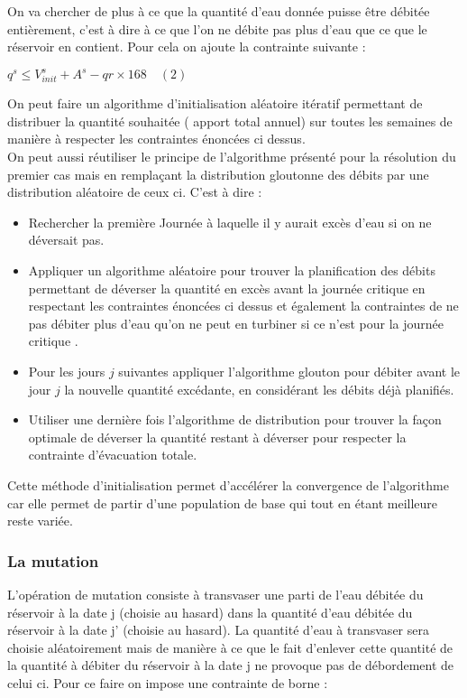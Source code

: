 \documentclass[a4paper]{report}
\begin{document}
On va chercher de plus à ce que la quantité d'eau donnée puisse être débitée entièrement, c'est à dire à ce que l'on ne débite pas plus d'eau que ce que le réservoir en contient. Pour cela on ajoute la contrainte suivante : \\
\begin{center}
$q^s \leq V^{s}_{init}+ A^{s}- qr \times 168 \quad(2) $
\end{center}
On peut faire un algorithme d'initialisation aléatoire itératif permettant de
distribuer la quantité souhaitée ( apport total annuel) sur toutes les semaines de
manière à respecter les contraintes énoncées ci dessus.\\
On peut aussi réutiliser le principe de l'algorithme présenté pour la résolution du premier cas mais en remplaçant la distribution gloutonne des débits par une distribution aléatoire de ceux ci.
C'est à dire :\\
\begin{itemize}
\item Rechercher la première Journée à laquelle il y aurait excès d'eau si on ne déversait pas.
\item Appliquer un algorithme aléatoire pour trouver la planification  des débits permettant de déverser la quantité en excès avant la journée critique en respectant les contraintes énoncées ci dessus et également la contraintes de ne pas débiter plus d'eau qu'on ne peut en turbiner si ce n'est pour la journée critique .

\item Pour les jours $j$ suivantes appliquer l'algorithme glouton pour débiter avant le jour $j$ la nouvelle quantité excédante, en considérant les débits déjà planifiés.
\item Utiliser une dernière fois l'algorithme de distribution pour trouver la façon optimale de déverser la quantité restant à déverser pour respecter la contrainte d'évacuation totale.
\end{itemize}
Cette méthode d'initialisation permet d'accélérer la convergence de l'algorithme car elle permet de partir d'une population de base qui tout en étant meilleure reste variée.
\subsubsection{La mutation}
L'opération de mutation consiste à  transvaser  une parti de l'eau débitée du réservoir à la date j (choisie au hasard) dans la quantité d'eau débitée du réservoir à la date j' (choisie au hasard).
La quantité d'eau à transvaser sera choisie aléatoirement mais de manière à ce que le fait d'enlever cette quantité de la quantité à débiter du réservoir à la date j ne provoque pas de débordement de celui ci.  Pour ce faire on impose une contrainte de borne :\\
\end{document}
